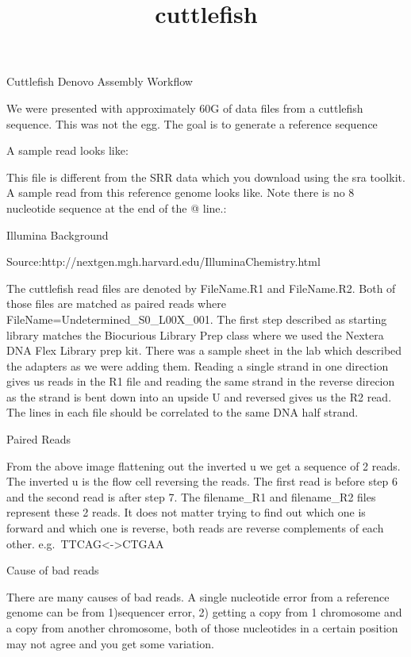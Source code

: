 \documentclass[11pt]{article}
\title{cuttlefish}
\begin{document}
    
    
    \maketitle
    
    

    
    Cuttlefish Denovo Assembly Workflow

We were presented with approximately 60G of data files from a cuttlefish
sequence. This was not the egg. The goal is to generate a reference
sequence

A sample read looks like:

This file is different from the SRR data which you download using the
sra toolkit. A sample read from this reference genome looks like. Note
there is no 8 nucleotide sequence at the end of the @ line.: 

    Illumina Background

Source:http://nextgen.mgh.harvard.edu/IlluminaChemistry.html

The cuttlefish read files are denoted by FileName.R1 and FileName.R2.
Both of those files are matched as paired reads where
FileName=Undetermined\_S0\_L00X\_001. The first step described as
starting library matches the Biocurious Library Prep class where we used
the Nextera DNA Flex Library prep kit. There was a sample sheet in the
lab which described the adapters as we were adding them. Reading a
single strand in one direction gives us reads in the R1 file and reading
the same strand in the reverse direcion as the strand is bent down into
an upside U and reversed gives us the R2 read. The lines in each file
should be correlated to the same DNA half strand.

 

    Paired Reads

From the above image flattening out the inverted u we get a sequence of
2 reads. The inverted u is the flow cell reversing the reads. The first
read is before step 6 and the second read is after step 7. The
filename\_R1 and filename\_R2 files represent these 2 reads. It does not
matter trying to find out which one is forward and which one is reverse,
both reads are reverse complements of each other.
e.g.~TTCAG\textless{}-\textgreater{}CTGAA

    Cause of bad reads

There are many causes of bad reads. A single nucleotide error from a
reference genome can be from 1)sequencer error, 2) getting a copy from 1
chromosome and a copy from another chromosome, both of those nucleotides
in a certain position may not agree and you get some variation.
\end{document}
